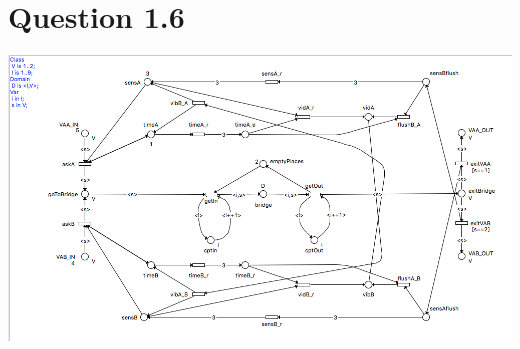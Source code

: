 \documentclass[a4paper, 11pt]{article}
\begin{document}
\section{Question 1.6}
\includegraphics[scale=0.35]{bridge.png}
\end{document}

